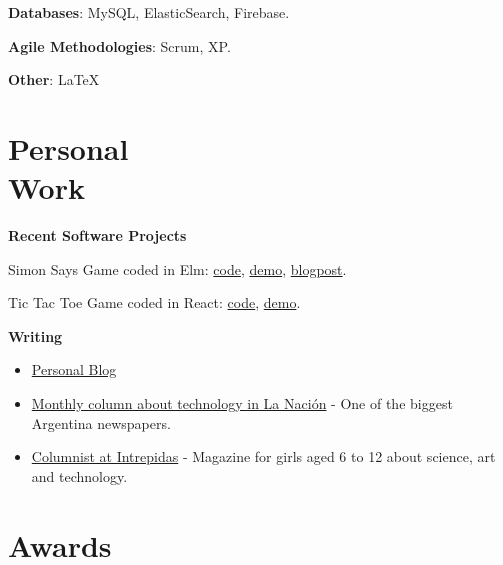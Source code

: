 \documentclass[margin,line]{resume}
\begin{document}
\begin{resume}
\textbf{Databases}: MySQL, ElasticSearch, Firebase. \vspace{-2mm}
    
\textbf{Agile Methodologies}: Scrum, XP. \vspace{-2mm}

\textbf{Other}: \LaTeX \vspace{-2mm}



\section{\mysidestyle Personal\\Work}

\textbf{Recent Software Projects}
\begin{list2}
\item Simon Says Game coded in Elm: \href{https://github.com/carohadad/simon-elm}{code}, \href{https://carohadad.github.io/simon-elm/}{demo}, \href{https://medium.com/@carohadad/mi-primer-programa-en-elm-574ce6a445c3}{blogpost}.

\item Tic Tac Toe Game coded in React: \href{https://github.com/carohadad/tic-tac-toe-react}{code}, \href{https://carohadad.github.io/tic-tac-toe-react/}{demo}.

\end{list2}

\textbf{Writing}
\begin{itemize}
\item \href{https://medium.com/@carohadad} {Personal Blog}
\item \href{http://www.lanacion.com.ar/autor/carolina-hadad-10522} {Monthly column about technology in La Naci\'on} - One of the biggest Argentina newspapers.
\item \href{https://www.intrepidas.com.ar/} {Columnist at Intrepidas} - Magazine for girls aged 6 to 12 about science, art and technology.
\end{itemize}




\section{\mysidestyle Awards}


\end{resume}
\end{document}
